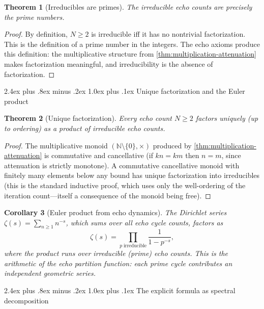 \documentclass[11pt,a4paper]{article}
\makeatletter
\theoremstyle{plain}
\newtheorem{theorem}{Theorem}[section]
\newtheorem{corollary}[theorem]{Corollary}
\theoremstyle{definition}
\theoremstyle{remark}
\numberwithin{equation}{section}
\newcommand{\Nat}{\mathbb{N}}
\renewcommand{\subsection}{%
  \@startsection{subsection}{2}{0pt}%
    {2.4ex plus .8ex minus .2ex}%
    {1.0ex plus .1ex}%
    {\normalfont\Large\bfseries\color{headingAccent}}%
}
\makeatother
\begin{document}
\begin{theorem}[Irreducibles are primes]
\label{thm:irreducibles-are-primes}
The irreducible echo counts are precisely the prime numbers.
\end{theorem}

\begin{proof}
By definition, \(N\ge2\) is irreducible iff it has no nontrivial
factorization.  This is the definition of a prime number in the
integers.  The echo axioms produce this definition: the multiplicative
structure from \cref{thm:multiplication-attenuation} makes
factorization meaningful, and irreducibility is the absence of
factorization.
\end{proof}

\subsection{Unique factorization and the Euler product}
\label{subsec:euler-product}

\begin{theorem}[Unique factorization]
\label{thm:unique-factorization}
Every echo count \(N\ge2\) factors uniquely (up to ordering) as a
product of irreducible echo counts.
\end{theorem}

\begin{proof}
The multiplicative monoid \((\Nat\setminus\{0\},\times)\) produced
by \cref{thm:multiplication-attenuation} is commutative and
cancellative (if \(kn=km\) then \(n=m\), since attenuation is
strictly monotone).  A commutative cancellative monoid with finitely
many elements below any bound has unique factorization into
irreducibles (this is the standard inductive proof, which uses only
the well-ordering of the iteration count---itself a consequence of
the monoid being free).
\end{proof}

\begin{corollary}[Euler product from echo dynamics]
\label{cor:euler-product}
The Dirichlet series
\(\zeta(s)=\sum_{n\ge1}n^{-s}\), which sums over all echo cycle
counts, factors as
\[
  \zeta(s)=\prod_{p\;\mathrm{irreducible}}\frac{1}{1-p^{-s}},
\]
where the product runs over irreducible (prime) echo counts.  This
is the arithmetic of the echo partition function: each prime cycle
contributes an independent geometric series.
\end{corollary}

\subsection{The explicit formula as spectral decomposition}
\end{document}
